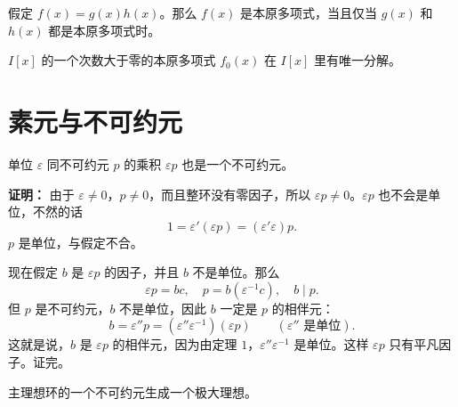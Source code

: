 \begin{lemma}[引理 1：本原多项式的乘积]
假定 $f(x)=g(x)h(x)$。那么 $f(x)$ 是本原多项式，当且仅当 $g(x)$ 和 $h(x)$ 都是本原多项式时。
\end{lemma}


\begin{lemma}[引理 4：本原多项式的唯一分解]
$I[x]$ 的一个次数大于零的本原多项式 $f_0(x)$ 在 $I[x]$ 里有唯一分解。
\end{lemma}

\section{素元与不可约元}

\begin{theorem}[定理 2：单位乘不可约元还是不可约元]
单位 $\varepsilon$ 同不可约元 $p$ 的乘积 $\varepsilon p$ 也是一个不可约元。

\textbf{证明：} 由于 $\varepsilon{}$，$p$，而且整环没有零因子，所以 $\varepsilon p$。$\varepsilon p$ 也不会是单位，不然的话
\[
1=\varepsilon'(\varepsilon p)=(\varepsilon'\varepsilon)p.
\]
$p$ 是单位，与假定不合。

现在假定 $b$ 是 $\varepsilon p$ 的因子，并且 $b$ 不是单位。那么
\[
\varepsilon p=bc,\quad p=b(\varepsilon^{-1}c),\quad b\mid p.
\]
但 $p$ 是不可约元，$b$ 不是单位，因此 $b$ 一定是 $p$ 的相伴元：
\[
b=\varepsilon''p=(\varepsilon''\varepsilon^{-1})(\varepsilon p)\qquad(\varepsilon''\text{ 是单位}).
\]
这就是说，$b$ 是 $\varepsilon p$ 的相伴元，因为由定理 $1$，$\varepsilon''\varepsilon^{-1}$ 是单位。这样 $\varepsilon p$ 只有平凡因子。证完。
\end{theorem}

\begin{lemma}[引理 2：主理想环的不可约元生成极大理想]
主理想环的一个不可约元生成一个极大理想。
\end{lemma}
